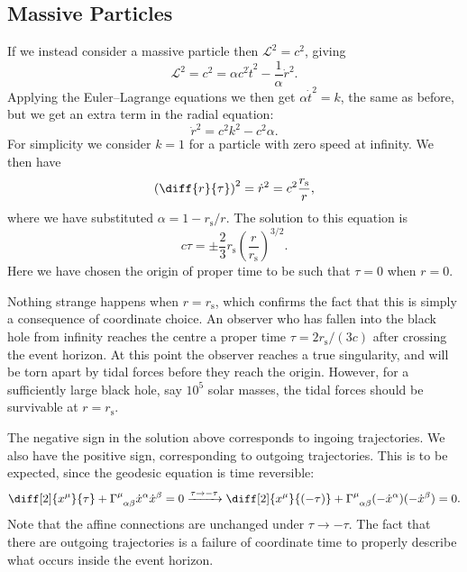 \documentclass[fleqn]{NotesClass}
\newcommand*{\christoffel}[3]{\tensor{\Gamma}{^{#1}_{{#2}{#3}}}}
\newcommand*{\lagrangian}{\mathcal{L}}
\begin{document}
    \subsection{Massive Particles}
    If we instead consider a massive particle then \(\lagrangian^2 = c^2\), giving
    \begin{equation}
        \lagrangian^2 = c^2 = \alpha c^2\dot{t}^2 - \frac{1}{\alpha}\dot{r}^2.
    \end{equation}
    Applying the Euler--Lagrange equations we then get \(\alpha\dot{t}^2 = k\), the same as before, but we get an extra term in the radial equation:
    \begin{equation}
        \dot{r}^2 = c^2k^2 - c^2\alpha.
    \end{equation}
    For simplicity we consider \(k = 1\) for a particle with zero speed at infinity.
    We then have
    \begin{equation}
        \left( \diff{r}{\tau} \right)^2 = \dot{r}^2 = c^2\frac{r_{\mathrm{s}}}{r},
    \end{equation}
    where we have substituted \(\alpha = 1 - r_{\mathrm{s}}/r\).
    The solution to this equation is
    \begin{equation}
        c\tau = \pm \frac{2}{3}r_{\mathrm{s}}\left( \frac{r}{r_{\mathrm{s}}} \right)^{3/2}.
    \end{equation}
    Here we have chosen the origin of proper time to be such that \(\tau = 0\) when \(r = 0\).
    
    Nothing strange happens when \(r = r_{\mathrm{s}}\), which confirms the fact that this is simply a consequence of coordinate choice.
    An observer who has fallen into the black hole from infinity reaches the centre a proper time \(\tau = 2r_{\mathrm{s}}/(3c)\) after crossing the event horizon.
    At this point the observer reaches a true singularity, and will be torn apart by tidal forces before they reach the origin.
    However, for a sufficiently large black hole, say \(10^5\) solar masses, the tidal forces should be survivable at \(r = r_{\mathrm{s}}\).
    
    The negative sign in the solution above corresponds to ingoing trajectories.
    We also have the positive sign, corresponding to outgoing trajectories.
    This is to be expected, since the geodesic equation is time reversible:
    \begin{equation}
        \diff[2]{x^\mu}{\tau} + \christoffel{\mu}{\alpha}{\beta}\dot{x}^\alpha\dot{x}^\beta = 0 \xrightarrow{\tau \to -\tau} \diff[2]{x^\mu}{(-\tau)} + \christoffel{\mu}{\alpha}{\beta}(-\dot{x}^\alpha)(-\dot{x}^\beta) = 0.
    \end{equation}
    Note that the affine connections are unchanged under \(\tau \to -\tau\).
    The fact that there are outgoing trajectories is a failure of coordinate time to properly describe what occurs inside the event horizon.
    
\end{document}
